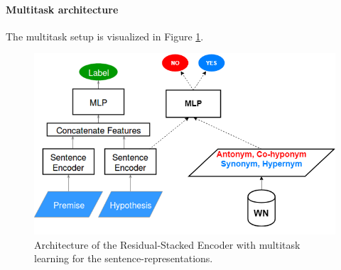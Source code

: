 \paragraph*{Multitask architecture}
The multitask setup is visualized in Figure \ref{fig:mt_architecture}.
\begin{figure}[tph!]
\centering
	\includegraphics[totalheight=5.5cm]{fig/mt_architecture.png}
	\caption{Architecture of the Residual-Stacked Encoder with multitask learning for the sentence-representations.}
	\label{fig:mt_architecture}
\end{figure}
